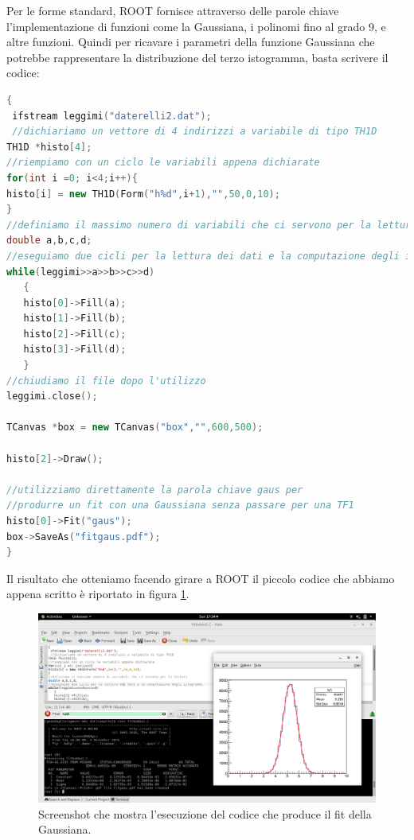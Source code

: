 \documentclass[11pt,fleqn]{book} %
\begin{document}
Per le forme standard, ROOT fornisce attraverso delle parole chiave l'implementazione di funzioni come la Gaussiana, i polinomi fino al grado 9, e altre funzioni. Quindi per ricavare i parametri della funzione Gaussiana che potrebbe rappresentare la distribuzione del terzo istogramma, basta scrivere il codice:


\begin{lstlisting}[language=c++]
{
 ifstream leggimi("daterelli2.dat");
 //dichiariamo un vettore di 4 indirizzi a variabile di tipo TH1D
TH1D *histo[4];
//riempiamo con un ciclo le variabili appena dichiarate
for(int i =0; i<4;i++){
histo[i] = new TH1D(Form("h%d",i+1),"",50,0,10);
}
//definiamo il massimo numero di variabili che ci servono per la lettura
double a,b,c,d;
//eseguiamo due cicli per la lettura dei dati e la computazione degli istogrammi
while(leggimi>>a>>b>>c>>d)
   {
   histo[0]->Fill(a);
   histo[1]->Fill(b);
   histo[2]->Fill(c);
   histo[3]->Fill(d);
   }
//chiudiamo il file dopo l'utilizzo
leggimi.close();

TCanvas *box = new TCanvas("box","",600,500);

histo[2]->Draw();

//utilizziamo direttamente la parola chiave gaus per 
//produrre un fit con una Gaussiana senza passare per una TF1
histo[0]->Fit("gaus");
box->SaveAs("fitgaus.pdf");
}
\end{lstlisting}

Il risultato che otteniamo facendo girare a ROOT il piccolo codice che abbiamo appena scritto è riportato in figura \ref{fitbabbo1}.


\begin{figure}[h]
\centering
\includegraphics[scale=0.3]{Pictures/fitbabbo1.png}
\caption{Screenshot che mostra l'esecuzione del codice che produce il fit della Gaussiana.   \label{fitbabbo1}}
\end{figure}
\end{document}
